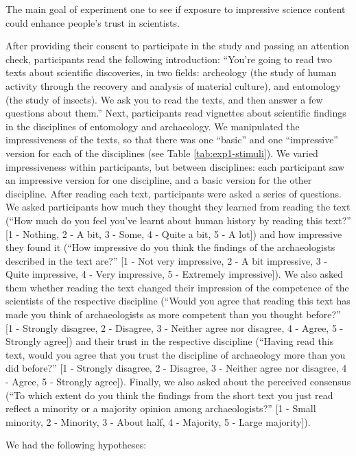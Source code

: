 \documentclass[
  doc,floatsintext]{apa6}
\begin{document}
The main goal of experiment one to see if exposure to impressive science content could enhance people's trust in scientists.

After providing their consent to participate in the study and passing an attention check, participants read the following introduction: ``You're going to read two texts about scientific discoveries, in two fields: archeology (the study of human activity through the recovery and analysis of material culture), and entomology (the study of insects). We ask you to read the texts, and then answer a few questions about them.'' Next, participants read vignettes about scientific findings in the disciplines of entomology and archaeology. We manipulated the impressiveness of the texts, so that there was one ``basic'' and one ``impressive'' version for each of the disciplines (see Table \ref{tab:exp1-stimuli}). We varied impressiveness within participants, but between disciplines: each participant saw an impressive version for one discipline, and a basic version for the other discipline. After reading each text, participants were asked a series of questions. We asked participants how much they thought they learned from reading the text (``How much do you feel you've learnt about human history by reading this text?'' {[}1 - Nothing, 2 - A bit, 3 - Some, 4 - Quite a bit, 5 - A lot{]}) and how impressive they found it (``How impressive do you think the findings of the archaeologists described in the text are?'' {[}1 - Not very impressive, 2 - A bit impressive, 3 - Quite impressive, 4 - Very impressive, 5 - Extremely impressive{]}). We also asked them whether reading the text changed their impression of the competence of the scientists of the respective discipline (``Would you agree that reading this text has made you think of archaeologists as more competent than you thought before?'' {[}1 - Strongly disagree, 2 - Disagree, 3 - Neither agree nor disagree, 4 - Agree, 5 - Strongly agree{]}) and their trust in the respective discipline (``Having read this text, would you agree that you trust the discipline of archaeology more than you did before?'' {[}1 - Strongly disagree, 2 - Disagree, 3 - Neither agree nor disagree, 4 - Agree, 5 - Strongly agree{]}). Finally, we also asked about the perceived consensus (``To which extent do you think the findings from the short text you just read reflect a minority or a majority opinion among archaeologists?'' {[}1 - Small minority, 2 - Minority, 3 - About half, 4 - Majority, 5 - Large majority{]}).

We had the following hypotheses:
\end{document}
